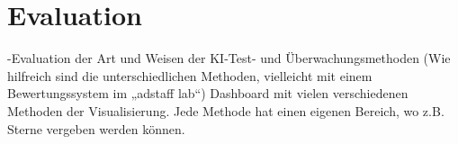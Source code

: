 \chapter{Evaluation}
\label{chap:auslieferung}

-Evaluation der Art und Weisen der KI-Test- und Überwachungsmethoden (Wie hilfreich sind die unterschiedlichen Methoden, vielleicht mit einem Bewertungssystem im „adstaff lab“)
Dashboard mit vielen verschiedenen Methoden der Visualisierung. Jede Methode hat einen eigenen Bereich, wo z.B. Sterne vergeben werden können.


\newpage